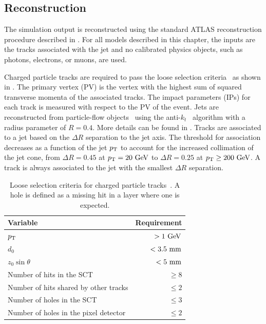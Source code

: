\subsection{Reconstruction}

The simulation output is reconstructed using the standard \Gls{ATLAS} reconstruction procedure described in .
For all models described in this chapter, the inputs are the tracks associated with the jet and no calibrated physics objects, such as photons, electrons, or muons, are used.

Charged particle tracks are required to pass the loose selection criteria~\cite{DL1D} as shown in .
The primary vertex (PV) is the vertex with the highest sum of squared transverse momenta of the associated tracks.
The impact parameters (IPs) for each track is measured with respect to the PV of the event.
Jets are reconstructed from particle-flow objects~\cite{PFlow} using the anti-$k_t$~\cite{AntiKt} algorithm with a radius parameter of $R = 0.4$.
More details can be found in .
Tracks are associated to a jet based on the $\Delta R$ separation to the jet axis.
The threshold for association decreases as a function of the jet $p_\mathrm{T}$ to account for the increased collimation of the jet cone, from $\Delta R = 0.45$ at $\pt = 20~\GeV$ to $\Delta R = 0.25$ at $\pt \geq 200~\GeV$.
A track is always associated to the jet with the smallest $\Delta R$ separation.

\begin{table}
    \centering
    \begin{tabular}{lr}
        \toprule
        Variable                              & Requirement \\
        \midrule
        $p_\mathrm{T}$                                 & $> 1~\GeV$  \\
        $d_0$                                 & $< 3.5~\mm$ \\
        $z_0 \sin \theta$                     & $< 5~\mm$   \\
        Number of hits in the SCT             & $\geq 8$    \\
        Number of hits shared by other tracks & $\leq 2$    \\
        Number of holes in the SCT            & $\leq 3$    \\
        Number of holes in the pixel detector & $\leq 2$    \\
        \bottomrule
    \end{tabular}
    \caption{Loose selection criteria for charged particle tracks~\cite{DL1D}. A hole is defined as a missing hit in a layer where one is expected.}
    \label{tab:track_loose}
\end{table}

